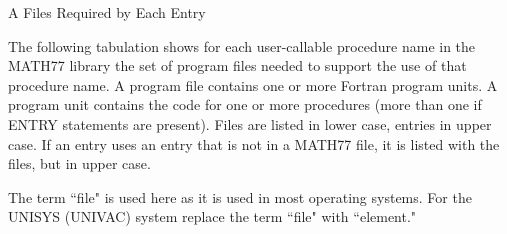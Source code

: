 \documentclass[twoside]{MATH77}
\begin{document}
\begapp A Files Required by Each Entry

{\normalsize The following tabulation shows for each user-callable procedure
name in the MATH77 library the set of program files needed to support the use
of that procedure name. A program file contains one or more Fortran program
units. A program unit contains the code for one or more procedures (more
than one if ENTRY statements are present).  Files are listed in lower
case, entries in upper case.  If an entry uses an entry that is
not in a MATH77 file, it is listed with the files, but in upper case.}

{\normalsize The term ``file" is used here as it is used in most operating
systems. For the UNISYS (UNIVAC) system replace the term ``file" with
``element."}\vspace{5pt}

\tabletail{}
\begin{supertabular}{@{}l@{\ }*{12}{@{ }l}}

\end{supertabular}
\end{document}
